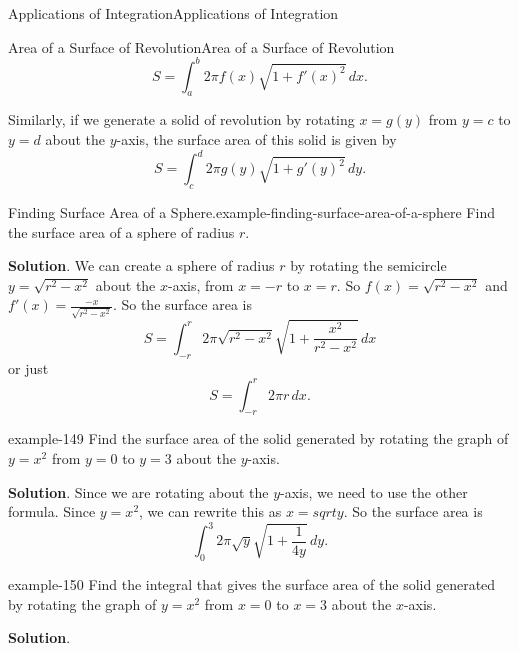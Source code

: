 \documentclass[10pt,]{book}
\numberwithin{equation}{section}
\begin{document}
\begin{chapterptx}{Applications of Integration}{}{Applications of Integration}{}{}
\begin{sectionptx}{Area of a Surface of Revolution}{}{Area of a Surface of Revolution}{}{}
\begin{equation*}
S=\int_{a}^{b}2\pi f(x)\sqrt{1+f'(x)^{2}}\,dx.
\end{equation*}
%
\par
\hypertarget{p-664}{}%
Similarly, if we generate a solid of revolution by rotating \(x=g(y)\) from \(y=c\) to \(y=d\) about the \(y\)-axis, the surface area of this solid is given by%
\begin{equation*}
S=\int_{c}^{d}2\pi g(y)\sqrt{1+g'(y)^{2}}\,dy.
\end{equation*}
%
\begin{example}{Finding Surface Area of a Sphere.}{example-finding-surface-area-of-a-sphere}%
\hypertarget{p-665}{}%
Find the surface area of a sphere of radius \(r\).%
\par\smallskip%
\noindent\textbf{Solution}.\hypertarget{solution-144}{}\quad%
\hypertarget{p-666}{}%
We can create a sphere of radius \(r\) by rotating the semicircle \(y=\sqrt{r^{2}-x^{2}}\) about the \(x\)-axis, from \(x=-r\) to \(x=r\). So \(f(x)=\sqrt{r^{2}-x^{2}}\) and \(f'(x)=\displaystyle\frac{-x}{\sqrt{r^{2}-x^{2}}}\). So the surface area is%
\begin{equation*}
S=\int_{-r}^{r}2\pi\sqrt{r^{2}-x^{2}}\sqrt{1+\frac{x^{2}}{r^{2}-x^{2}}}\,dx
\end{equation*}
or just%
\begin{equation*}
S=\int_{-r}^{r}2\pi r \, dx.
\end{equation*}
%
\end{example}
\begin{example}{}{example-149}%
\hypertarget{p-667}{}%
Find the surface area of the solid generated by rotating the graph of \(y=x^{2}\) from \(y=0\) to \(y=3\) about the \(y\)-axis.%
\par\smallskip%
\noindent\textbf{Solution}.\hypertarget{solution-145}{}\quad%
\hypertarget{p-668}{}%
Since we are rotating about the \(y\)-axis, we need to use the other formula. Since \(y=x^{2}\), we can rewrite this as \(x=sqrt{y}\). So the surface area is%
\begin{equation*}
\int_{0}^{3}2\pi\sqrt{y}\sqrt{1+\frac{1}{4y}}\,dy.
\end{equation*}
%
\end{example}
\begin{example}{}{example-150}%
\hypertarget{p-669}{}%
Find the integral that gives the surface area of the solid generated by rotating the graph of \(y=x^{2}\) from \(x=0\) to \(x=3\) about the \(x\)-axis.%
\par\smallskip%
\noindent\textbf{Solution}.\hypertarget{solution-146}{}\quad%

\end{example}
\end{sectionptx}
\end{chapterptx}
\end{document}
